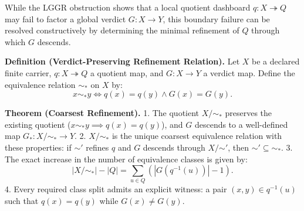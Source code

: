 \documentclass[
  10pt,
]{article}
\begin{document}
While the LGGR obstruction shows that a local quotient dashboard \protect\hypertarget{math-E0057-0067}{}{\(q: X \twoheadrightarrow Q\)} may fail to factor a global verdict \protect\hypertarget{math-E0058-0068}{}{\(G: X \to Y\)}, this boundary failure can be resolved constructively by determining the minimal refinement of \protect\hypertarget{math-E0059-0069}{}{\(Q\)} through which \protect\hypertarget{math-E0060-0070}{}{\(G\)} descends.

\textbf{Definition (Verdict-Preserving Refinement Relation).} Let \protect\hypertarget{math-E0061-0071}{}{\(X\)} be a declared finite carrier, \protect\hypertarget{math-E0057-0072}{}{\(q: X \twoheadrightarrow Q\)} a quotient map, and \protect\hypertarget{math-E0058-0073}{}{\(G: X \to Y\)} a verdict map. Define the equivalence relation \protect\hypertarget{math-E0062-0074}{}{\(\sim_*\)} on \protect\hypertarget{math-E0061-0075}{}{\(X\)} by: \protect\hypertarget{math-E0063-0076}{}{\[
x \sim_* y \iff q(x) = q(y) \land G(x) = G(y).
\]}

\textbf{Theorem (Coarsest Refinement).} 1. The quotient \protect\hypertarget{math-E0064-0077}{}{\(X / {\sim_*}\)} preserves the existing quotient (\protect\hypertarget{math-E0065-0078}{}{\(x \sim_* y \implies q(x) = q(y)\)}), and \protect\hypertarget{math-E0060-0079}{}{\(G\)} descends to a well-defined map \protect\hypertarget{math-E0066-0080}{}{\(G_* : X / {\sim_*} \to Y\)}. 2. \protect\hypertarget{math-E0064-0081}{}{\(X / {\sim_*}\)} is the unique coarsest equivalence relation with these properties: if \protect\hypertarget{math-E0067-0082}{}{\(\sim'\)} refines \protect\hypertarget{math-E0068-0083}{}{\(q\)} and \protect\hypertarget{math-E0060-0084}{}{\(G\)} descends through \protect\hypertarget{math-E0069-0085}{}{\(X / {\sim'}\)}, then \protect\hypertarget{math-E0070-0086}{}{\(\sim' \subseteq \sim_*\)}. 3. The exact increase in the number of equivalence classes is given by: \protect\hypertarget{math-E0071-0087}{}{\[
|X / {\sim_*}| - |Q| = \sum_{u \in Q} (|G(q^{-1}(u))| - 1).
\]} 4. Every required class split admits an explicit witness: a pair \protect\hypertarget{math-E0072-0088}{}{\((x, y) \in q^{-1}(u)\)} such that \protect\hypertarget{math-E0073-0089}{}{\(q(x) = q(y)\)} while \protect\hypertarget{math-E0074-0090}{}{\(G(x) \neq G(y)\)}.
\end{document}
